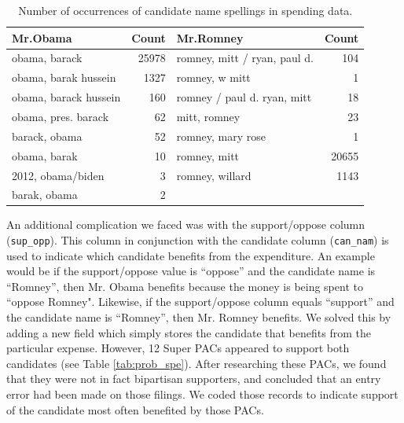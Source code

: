 \documentclass[11pt]{article}\usepackage{graphicx, color}
\begin{document}
\begin{table}[ht]
\begin{center}
\begin{tabular}{lrlr}
  \hline
Mr.Obama & Count & Mr.Romney & Count \\ 
  \hline
obama, barack & 25978 & romney, mitt / ryan, paul d. & 104 \\ 
  obama, barak hussein & 1327 & romney, w mitt &   1 \\ 
  obama, barack hussein & 160 & romney / paul d. ryan, mitt &  18 \\ 
  obama, pres. barack &  62 & mitt, romney &  23 \\ 
  barack, obama &  52 & romney, mary rose &   1 \\ 
  obama, barak &  10 & romney, mitt & 20655 \\ 
  2012, obama/biden &   3 & romney, willard & 1143 \\ 
  barak, obama &   2 &  &  \\ 
   \hline
\end{tabular}
\caption{Number of occurrences of candidate name spellings in spending data.}
\label{tab:can_nam}
\end{center}
\end{table}



An additional complication we faced was with the support/oppose column (\texttt{sup\_opp}). This column in conjunction with the candidate column (\texttt{can\_nam}) is used to indicate which candidate benefits from the expenditure. An example would be if the support/oppose value is ``oppose'' and the candidate name is ``Romney'', then Mr. Obama benefits because the money is being spent to ``oppose Romney". Likewise, if the support/oppose column equals ``support'' and the candidate name is ``Romney'', then Mr. Romney benefits. We solved this by adding a new field which simply stores the candidate that benefits from the particular expense.  However, 12 Super PACs appeared to support both candidates (see Table \ref{tab:prob_spe}). After researching these PACs, we found that they were not in fact bipartisan supporters, and concluded that an entry error had been made on those filings. We coded those records to indicate support of the candidate most often benefited by those PACs.
\end{document}
